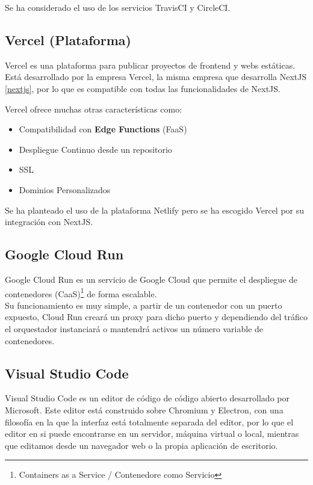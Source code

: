 Se ha considerado el uso de los servicios TravisCI y CircleCI.

\hypertarget{vercel-plataforma}{%
\subsection{Vercel (Plataforma)}\label{vercel-plataforma}}

Vercel es una plataforma para publicar proyectos de frontend y webs
estáticas. Está desarrollado por la empresa Vercel, la misma empresa que
desarrolla NextJS \ref{nextjs}, por lo que es compatible con todas las
funcionalidades de NextJS.

Vercel ofrece muchas otras características como:

\begin{itemize}
\itemsep0em 
\item
  Compatibilidad con \textbf{Edge Functions} (FaaS)
\item
  Despliegue Continuo desde un repositorio
\item
  SSL
\item
  Dominios Personalizados
\end{itemize}

Se ha planteado el uso de la plataforma Netlify pero se ha escogido Vercel por su integración con NextJS.

\hypertarget{google-cloud-run}{%
\subsection{Google Cloud Run}\label{google-cloud-run}}

Google Cloud Run es un servicio de Google Cloud que permite el
despliegue de contenedores (CaaS)\footnote{Containers as a Service / Contenedore como Servicio} de forma escalable.\\
Su funcionamiento es muy simple, a partir de un contenedor con un puerto
expuesto, Cloud Run creará un proxy para dicho puerto y dependiendo del
tráfico el orquestador instanciará o mantendrá activos un número
variable de contenedores.

\hypertarget{visual-studio-code}{%
\subsection{Visual Studio Code}\label{visual-studio-code}}

Visual Studio Code es un editor de código de código abierto desarrollado
por Microsoft. Este editor está construido sobre Chromium y Electron,
con una filosofía en la que la interfaz está totalmente separada del
editor, por lo que el editor en si puede encontrarse en un servidor,
máquina virtual o local, mientras que editamos desde un navegador web o
la propia aplicación de escritorio.

